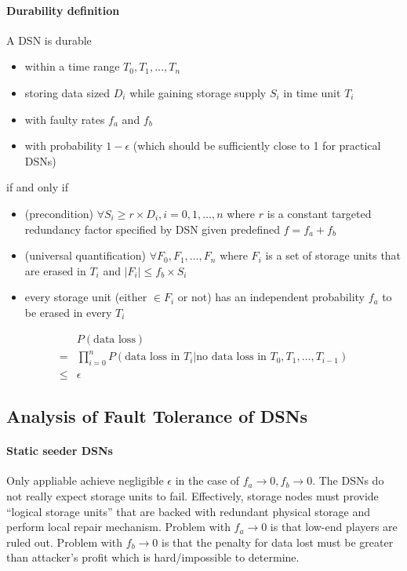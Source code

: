\paragraph{Durability definition}
A DSN is durable 
\begin{itemize}
    \item within a time range $T_0,T_1,\dots,T_n$
    \item storing data sized $D_i$ while gaining storage supply $S_i$ in time unit $T_i$
    \item with faulty rates $f_a$ and $f_b$
    \item with probability $1-\epsilon$ (which should be sufficiently close to 1 for practical DSNs)
\end{itemize}
if and only if
\begin{itemize}
    \item (precondition) $\forall S_i\geq r\times D_i,i=0,1,\dots,n$ where $r$ is a constant targeted redundancy factor specified by DSN given predefined $f=f_a+f_b$
    \item (universal quantification) $\forall F_0,F_1,\dots,F_n$ where $F_i$ is a set of storage units that are erased in $T_i$ and $|F_i|\leq f_b\times S_i$
    \item every storage unit (either $\in F_i$ or not) has an independent probability $f_a$ to be erased in every $T_i$
\end{itemize}
\begin{align*}
    &P(\text{data loss})\\
=   &\prod_{i=0}^n{P(\text{data loss in }T_i|\text{no data loss in }T_0,T_1,\dots,T_{i-1})}\\
\leq&\epsilon
\end{align*}


\subsection{Analysis of Fault Tolerance of DSNs}

\paragraph{Static seeder DSNs}
Only appliable \ie achieve negligible $\epsilon$ in the case of $f_a\to 0,f_b\to 0$.
The DSNs do not really expect storage units to fail.
Effectively, storage nodes must provide ``logical storage units'' that are backed with redundant physical storage and perform local repair mechanism.
Problem with $f_a\to 0$ is that low-end players are ruled out.
Problem with $f_b\to 0$ is that the penalty for data lost must be greater than attacker's profit which is hard/impossible to determine.

